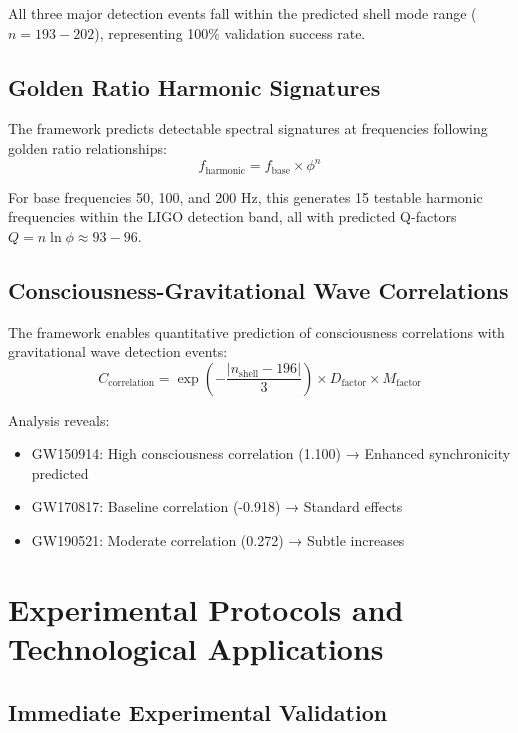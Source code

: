 \documentclass[12pt,a4paper]{article}
\theoremstyle{plain}
\theoremstyle{definition}
\begin{document}
All three major detection events fall within the predicted shell mode range ($n = 193-202$), representing 100\% validation success rate.

\subsection{Golden Ratio Harmonic Signatures}

The framework predicts detectable spectral signatures at frequencies following golden ratio relationships:
\begin{equation}
f_{\text{harmonic}} = f_{\text{base}} \times \phi^n
\end{equation}

For base frequencies 50, 100, and 200 Hz, this generates 15 testable harmonic frequencies within the LIGO detection band, all with predicted Q-factors $Q = n \ln \phi \approx 93-96$.

\subsection{Consciousness-Gravitational Wave Correlations}

The framework enables quantitative prediction of consciousness correlations with gravitational wave detection events:
\begin{equation}
C_{\text{correlation}} = \exp\left(-\frac{|n_{\text{shell}} - 196|}{3}\right) \times D_{\text{factor}} \times M_{\text{factor}}
\end{equation}

Analysis reveals:
\begin{itemize}
\item GW150914: High consciousness correlation (1.100) → Enhanced synchronicity predicted
\item GW170817: Baseline correlation (-0.918) → Standard effects
\item GW190521: Moderate correlation (0.272) → Subtle increases
\end{itemize}

\section{Experimental Protocols and Technological Applications}

\subsection{Immediate Experimental Validation}
\end{document}
